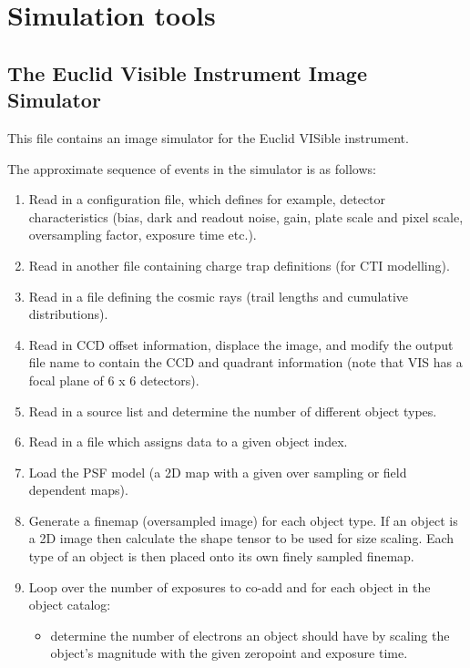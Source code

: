 \documentclass[a4paper,11pt,english]{sphinxmanual}
\begin{document}
\section{Simulation tools}
\label{simulator:module-simulator.simulator}\label{simulator::doc}\label{simulator:simulation-tools}

\subsection{The Euclid Visible Instrument Image Simulator}
\label{simulator:the-euclid-visible-instrument-image-simulator}
This file contains an image simulator for the Euclid VISible instrument.

The approximate sequence of events in the simulator is as follows:
\begin{enumerate}
\item {} 
Read in a configuration file, which defines for example,
detector characteristics (bias, dark and readout noise, gain,
plate scale and pixel scale, oversampling factor, exposure time etc.).

\item {} 
Read in another file containing charge trap definitions (for CTI modelling).

\item {} 
Read in a file defining the cosmic rays (trail lengths and cumulative distributions).

\item {} 
Read in CCD offset information, displace the image, and modify
the output file name to contain the CCD and quadrant information
(note that VIS has a focal plane of 6 x 6 detectors).

\item {} 
Read in a source list and determine the number of different object types.

\item {} 
Read in a file which assigns data to a given object index.

\item {} 
Load the PSF model (a 2D map with a given over sampling or field dependent maps).

\item {} 
Generate a finemap (oversampled image) for each object type. If an object
is a 2D image then calculate the shape tensor to be used for size scaling.
Each type of an object is then placed onto its own finely sampled finemap.

\item {} 
Loop over the number of exposures to co-add and for each object in the object catalog:
\begin{itemize}
\item {} 
determine the number of electrons an object should have by scaling the object's magnitude
with the given zeropoint and exposure time.


\end{itemize}
\end{enumerate}
\end{document}
